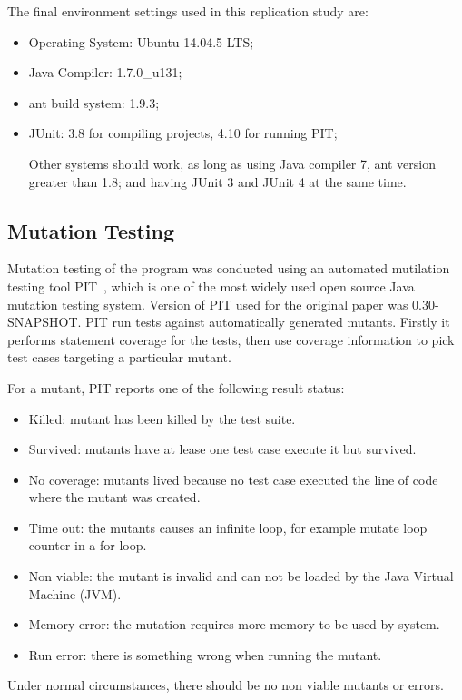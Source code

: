 The final environment settings used in this replication study are:
\begin{itemize}
	\item Operating System: Ubuntu 14.04.5 LTS;
	\item Java Compiler: 1.7.0\_u131;
	\item ant build system: 1.9.3;
	\item JUnit: 3.8 for compiling projects, 4.10 for running PIT;
	
Other systems should work, as long as using Java compiler 7, ant version greater than 1.8; and having JUnit 3 and JUnit 4  at the same time.
\end{itemize}


\subsection{Mutation Testing}
\label{subsec:mutationTesting}
Mutation testing of the program was conducted using an automated mutilation testing tool PIT~\cite{pit}, which is one of the most widely used open source Java mutation testing system. Version of PIT used for the original paper was 0.30-SNAPSHOT. PIT run tests against automatically generated mutants. Firstly it performs statement coverage for the tests, then use coverage information to pick test cases targeting a particular mutant.

For a mutant, PIT reports one of the following result status:
\begin{itemize}
	\item Killed: mutant has been killed by the test suite.
	\item Survived: mutants have at lease one test case execute it but survived.
	\item No coverage: mutants lived because no test case executed the line of code where the mutant was created. 
	\item Time out: the mutants causes an infinite loop, for example mutate loop counter in a for loop.
	\item Non viable: the mutant is invalid and can not be loaded by the Java Virtual Machine (JVM).
	\item Memory error: the mutation requires more memory to be used by system.
	\item Run error: there is something wrong when running the mutant.	
\end{itemize}

Under normal circumstances, there should be no non viable mutants or errors.

